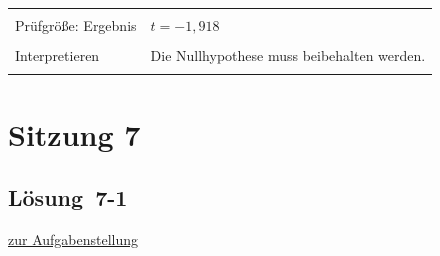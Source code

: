 \documentclass[
  11pt,
  ngerman,
  a4paper,
]{report}
\begin{document}
\begin{table}[H]
\begin{tabular}{>{\raggedright\arraybackslash}p{8cm}>{\raggedright\arraybackslash}p{8cm}}
\cellcolor{gray!6}{Prüfgröße: Einsetzen} & \cellcolor{gray!6}{$t=\frac{1186-1337{,}56}{\sqrt{\frac{2919{,}25+53274{,}52}{9}}}$}\\
Prüfgröße: Ergebnis & $t =-1{,}918$\\
\cellcolor{gray!6}{Interpretieren} & \cellcolor{gray!6}{Der Ablehungsbereich wurde nicht erreicht.}\\
Interpretieren & Die Nullhypothese muss beibehalten werden.\\
\cellcolor{gray!6}{Interpretieren} & \cellcolor{gray!6}{Die Abrufzahlen zwischen Hessen und Niedersachsen unterscheiden sich nicht signifikant. ($\alpha=0{,}01$)}\\
\bottomrule
\end{tabular}
\end{table}

\hypertarget{sitzung-7}{%
\section*{Sitzung 7}\label{sitzung-7}}

\hypertarget{loesung-7-1}{%
\subsection{Lösung~7-1}\label{loesung-7-1}}

\protect\hyperlink{aufgabe-7-1}{zur Aufgabenstellung}
\end{document}
